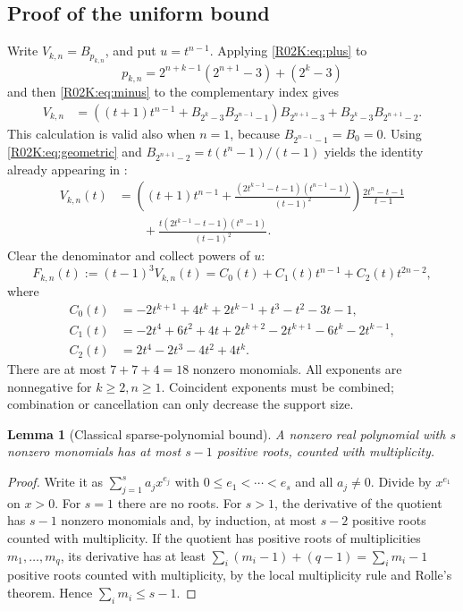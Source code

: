 \documentclass[11pt,a4paper]{article}
\newtheorem{SourceRacKlemma}[SourceRacKtheorem]{Lemma}
\begin{document}
\subsection{Proof of the uniform bound}
Write $V_{k,n}=B_{p_{k,n}}$, and put $u=t^{n-1}$. Applying
\eqref{R02K:eq:plus} to
\[
p_{k,n}=2^{n+k-1}(2^{n+1}-3)+(2^k-3)
\]
and then \eqref{R02K:eq:minus} to the complementary index gives
\begin{align*}
V_{k,n}
&=\left((t+1)t^{n-1}+B_{2^k-3}B_{2^{n-1}-1}\right)B_{2^{n+1}-3}
   +B_{2^k-3}B_{2^{n+1}-2}.
\end{align*}
This calculation is valid also when $n=1$, because $B_{2^{n-1}-1}=B_0=0$.
Using \eqref{R02K:eq:geometric} and
$B_{2^{n+1}-2}=t(t^n-1)/(t-1)$ yields the identity already appearing in
\cite[proof of Theorem 2.3]{R02K:Ulas}:
\begin{align*}
V_{k,n}(t)
&=\left((t+1)t^{n-1}+
 \frac{(2t^{k-1}-t-1)(t^{n-1}-1)}{(t-1)^2}\right)
 \frac{2t^n-t-1}{t-1}\\
&\qquad+\frac{t(2t^{k-1}-t-1)(t^n-1)}{(t-1)^2}.
\end{align*}
Clear the denominator and collect powers of $u$:
\begin{equation}\label{R02K:eq:sparse}
F_{k,n}(t):=(t-1)^3V_{k,n}(t)=C_0(t)+C_1(t)t^{n-1}+C_2(t)t^{2n-2},
\end{equation}
where
\begin{align*}
C_0(t)&=-2t^{k+1}+4t^k+2t^{k-1}+t^3-t^2-3t-1,\\
C_1(t)&=-2t^4+6t^2+4t+2t^{k+2}-2t^{k+1}-6t^k-2t^{k-1},\\
C_2(t)&=2t^4-2t^3-4t^2+4t^k.
\end{align*}
There are at most $7+7+4=18$ nonzero monomials. All exponents are
nonnegative for $k\ge2,n\ge1$. Coincident exponents must be combined;
combination or cancellation can only decrease the support size.

\begin{SourceRacKlemma}[Classical sparse-polynomial bound]\label{R02K:lem:sparse}
A nonzero real polynomial with $s$ nonzero monomials has at most $s-1$
positive roots, counted with multiplicity.
\end{SourceRacKlemma}
\begin{proof}
Write it as $\sum_{j=1}^s a_jx^{e_j}$ with
$0\le e_1<\cdots<e_s$ and all $a_j\ne0$. Divide by $x^{e_1}$ on
$x>0$. For $s=1$ there are no roots. For $s>1$, the derivative of the
quotient has $s-1$ nonzero monomials and, by induction, at most $s-2$
positive roots counted with multiplicity. If the quotient has positive roots
of multiplicities $m_1,\ldots,m_q$, its derivative has at least
$\sum_i(m_i-1)+(q-1)=\sum_i m_i-1$ positive roots counted with
multiplicity, by the local multiplicity rule and Rolle's theorem. Hence
$\sum_i m_i\le s-1$.
\end{proof}
\end{document}
